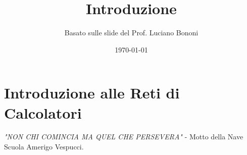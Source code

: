 


\title{Introduzione}
\author{Basato sulle slide del Prof. Luciano Bononi}
\date{\today}



\maketitle
\tableofcontents
\newpage

\section{Introduzione alle Reti di Calcolatori}

\textit{"NON CHI COMINCIA MA QUEL CHE PERSEVERA"} - Motto della Nave Scuola Amerigo Vespucci.

